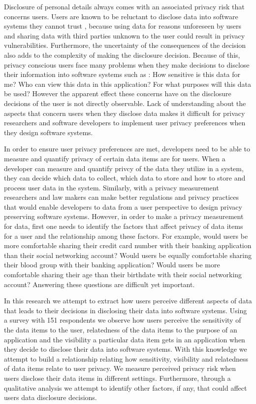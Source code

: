 \documentclass[conference]{IEEEtran}
\begin{document}
Disclosure of personal details always comes with an associated privacy risk that concerns users. Users are known to be reluctant to disclose data into software systems they cannot trust \cite {kobsa2007privacy}, because using data for reasons unforeseen by users and sharing data with third parties unknown to the user could result in privacy vulnerabilities. Furthermore, the uncertainty of the consequences of the decision also adds to the complexity of making the disclosure decision. Because of this, privacy conscious users face many problems when they make decisions to disclose their information into software systems such as : How sensitive is this data for me? Who can view this data in this application? For what purposes will this data be used? However the apparent effect these concerns have on the disclosure decisions of the user is not directly observable. Lack of understanding about the aspects that concern users when they disclose data makes it difficult for privacy researchers and software developers to implement user privacy preferences when they design software systems. 

In order to ensure user privacy preferences are met, developers need to be able to measure and quantify privacy of certain data items are for users. When a developer can measure and quantify privcy of the data they utilize in a system, they can decide which data to collect, which data to store and how to store and process user data in the system. Similarly, with a privacy measurement researchers and law makers can make better regulations and privacy practices that would enable developers to data from a user perspective to design privacy preserving software systems. However, in order to make a privacy measurement for data, first one needs to identify the factors that affect privacy of data items for a user and the relationship among these factors. For example, would users be more comfortable sharing their credit card number with their banking application than their social networking account? Would users be equally comfortable sharing their blood group with their banking application? Would users be more comfortable sharing their age than their birthdate with their social networking account? Answering these questions are difficult yet important. 

In this research we attempt to extract how users perceive different aspects of data that leads to their decisions in disclosing their data into software systems. Using a survey with 151 respondents we observe how users perceive the sensitivity of the data items to the user, relatedness of the data items to the purpose of an application and the visibility a particular data item gets in an application when they decide to disclose their data into software systems. With this knowledge we attempt to build a relationship relating how sensitivity, visibility and relatedness of data items relate to user privacy. We measure perceived privacy risk when users disclose their data items in different settings. Furthermore, through a qualitative analysis we attempt to identify other factors, if any, that could affect users data disclosure decisions.
\end{document}
